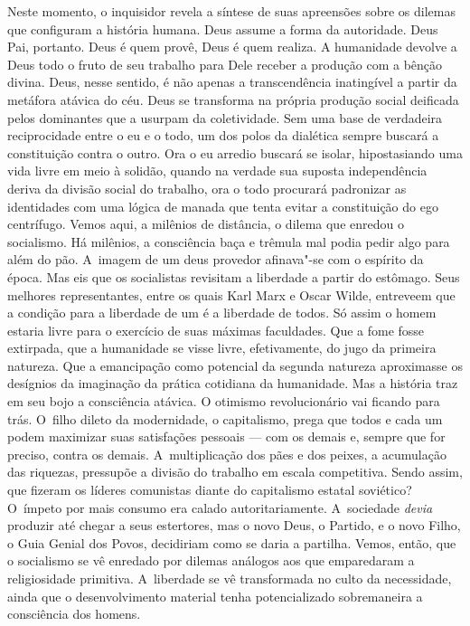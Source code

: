 Neste momento, o inquisidor revela a síntese de suas apreensões sobre os
dilemas que configuram a história humana. Deus assume a forma da
autoridade. Deus Pai, portanto. Deus é quem provê, Deus é quem realiza.
A humanidade devolve a Deus todo o fruto de seu trabalho para Dele
receber a produção com a bênção divina. Deus, nesse sentido, é não
apenas a transcendência inatingível a partir da metáfora atávica do céu.
Deus se transforma na própria produção social deificada pelos dominantes
que a usurpam da coletividade. Sem uma base de verdadeira reciprocidade
entre o eu e o todo, um dos polos da dialética sempre buscará a
constituição contra o outro. Ora o eu arredio buscará se isolar,
hipostasiando uma vida livre em meio à solidão, quando na verdade sua
suposta independência deriva da divisão social do trabalho, ora o todo
procurará padronizar as identidades com uma lógica de manada que tenta
evitar a constituição do ego centrífugo. Vemos aqui, a milênios de
distância, o dilema que enredou o socialismo. Há milênios, a consciência
baça e trêmula mal podia pedir algo para além do pão. A~imagem de um
deus provedor afinava"-se com o espírito da época. Mas eis que os
socialistas revisitam a liberdade a partir do estômago. Seus melhores
representantes, entre os quais Karl Marx e Oscar Wilde, entreveem que a
condição para a liberdade de um é a liberdade de todos. Só assim o homem
estaria livre para o exercício de suas máximas faculdades. Que a fome
fosse extirpada, que a humanidade se visse livre, efetivamente, do jugo
da primeira natureza. Que a emancipação como potencial da segunda
natureza aproximasse os desígnios da imaginação da prática cotidiana da
humanidade. Mas a história traz em seu bojo a consciência atávica. O
otimismo revolucionário vai ficando para trás. O~filho dileto da
modernidade, o capitalismo, prega que todos e cada um podem maximizar
suas satisfações pessoais --- com os demais e, sempre que for preciso,
contra os demais. A~multiplicação dos pães e dos peixes, a acumulação
das riquezas, pressupõe a divisão do trabalho em escala competitiva.
Sendo assim, que fizeram os líderes comunistas diante do capitalismo
estatal soviético? O~ímpeto por mais consumo era calado
autoritariamente. A~sociedade \emph{devia} produzir até chegar a seus
estertores, mas o novo Deus, o Partido, e o novo Filho, o Guia Genial
dos Povos, decidiriam como se daria a partilha. Vemos, então, que o
socialismo se vê enredado por dilemas análogos aos que emparedaram a
religiosidade primitiva. A~liberdade se vê transformada no culto da
necessidade, ainda que o desenvolvimento material tenha potencializado
sobremaneira a consciência dos homens.

